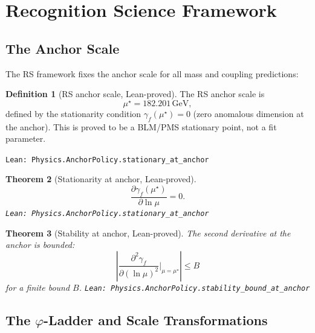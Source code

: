 \documentclass[12pt,a4paper]{article}
\newtheorem{theorem}{Theorem}[section]
\theoremstyle{definition}
\newtheorem{definition}[theorem]{Definition}
\theoremstyle{remark}
\begin{document}
\section{Recognition Science Framework}
\label{sec:rs}

\subsection{The Anchor Scale}

The RS framework fixes the anchor scale for all mass and coupling
predictions:

\begin{definition}[RS anchor scale, Lean-proved]
\label{def:anchor}
The RS anchor scale is
\begin{equation}
  \mu^\star = 182.201\,\mathrm{GeV},
  \label{eq:mustar}
\end{equation}
defined by the stationarity condition $\gamma_f(\mu^\star) = 0$
(zero anomalous dimension at the anchor).  This is proved to be a
BLM/PMS stationary point, not a fit parameter.

\texttt{Lean: Physics.AnchorPolicy.stationary\_at\_anchor}
\end{definition}

\begin{theorem}[Stationarity at anchor, Lean-proved]\label{thm:stationary}
\begin{equation}
  \frac{\partial \gamma_f(\mu^\star)}{\partial\ln\mu} = 0.
\end{equation}
\texttt{Lean: Physics.AnchorPolicy.stationary\_at\_anchor}
\end{theorem}

\begin{theorem}[Stability at anchor, Lean-proved]\label{thm:stability}
The second derivative at the anchor is bounded:
\begin{equation}
  \left|\frac{\partial^2 \gamma_f}{\partial(\ln\mu)^2}\bigg|_{\mu=\mu^\star}\right|
  \leq B
\end{equation}
for a finite bound $B$.
\texttt{Lean: Physics.AnchorPolicy.stability\_bound\_at\_anchor}
\end{theorem}

\subsection{The $\varphi$-Ladder and Scale Transformations}
\end{document}
